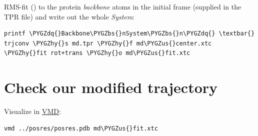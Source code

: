 \documentclass[letterpaper,10pt,english]{sphinxmanual}
\def\PYGZbs{\char`\\}
\def\PYGZus{\char`\_}
\def\PYGZhy{\char`\-}
\def\PYGZdq{\char`\"}
\begin{document}
RMS-fit () to the protein \emph{backbone} atoms in
the initial frame (supplied in the TPR file) and write out the
whole \emph{System}:

\begin{Verbatim}[commandchars=\\\{\}]
printf \PYGZdq{}Backbone\PYGZbs{}nSystem\PYGZbs{}n\PYGZdq{} \textbar{} trjconv \PYGZhy{}s md.tpr \PYGZhy{}f md\PYGZus{}center.xtc \PYGZhy{}fit rot+trans \PYGZhy{}o md\PYGZus{}fit.xtc
\end{Verbatim}


\section{Check our modified trajectory}
\label{trajectory_visualization:check-our-modified-trajectory}
Visualize in \href{http://www.ks.uiuc.edu/Research/vmd/}{VMD}:

\begin{Verbatim}[commandchars=\\\{\}]
vmd ../posres/posres.pdb md\PYGZus{}fit.xtc
\end{Verbatim}
\end{document}
